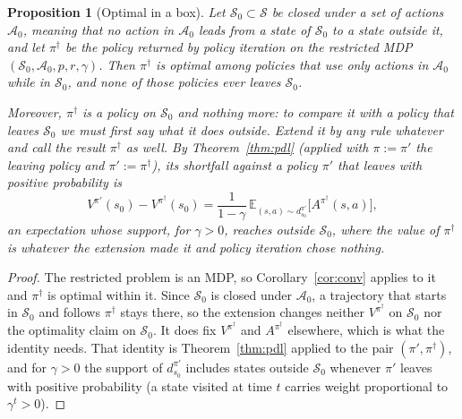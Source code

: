 \documentclass[11pt,a4paper]{article}
\newcommand{\E}{\mathbb{E}}
\newcommand{\Sset}{\mathcal{S}}
\newcommand{\Aset}{\mathcal{A}}
\newcommand{\occ}[2]{d^{#1}_{#2}}
\theoremstyle{plain}
\newtheorem{proposition}[theorem]{Proposition}
\theoremstyle{definition}
\theoremstyle{remark}
\begin{document}
\begin{proposition}[Optimal in a box]\label{prop:box}
Let $\Sset_0\subset\Sset$ be closed under a set of actions $\Aset_0$, meaning that no action in $\Aset_0$ leads from a state of $\Sset_0$ to a state outside it, and let $\pi^\dagger$ be the policy returned by policy iteration on the restricted MDP $(\Sset_0,\Aset_0,p,r,\gamma)$. Then $\pi^\dagger$ is optimal among policies that use only actions in $\Aset_0$ while in $\Sset_0$, and none of those policies ever leaves $\Sset_0$.

Moreover, $\pi^\dagger$ is a policy on $\Sset_0$ and nothing more: to compare it with a policy that leaves $\Sset_0$ we must first say what it does outside. Extend it by any rule whatever and call the result $\pi^\dagger$ as well. By Theorem~\ref{thm:pdl} (applied with $\pi:=\pi'$ the leaving policy and $\pi':=\pi^\dagger$), its shortfall against a policy $\pi'$ that leaves with positive probability is
\[
V^{\pi'}(s_0)-V^{\pi^\dagger}(s_0)=\frac1{1-\gamma}\,\E_{(s,a)\sim\occ{\pi'}{s_0}}\big[A^{\pi^\dagger}(s,a)\big],
\]
an expectation whose support, for $\gamma>0$, reaches outside $\Sset_0$, where the value of $\pi^\dagger$ is whatever the extension made it and policy iteration chose nothing.
\end{proposition}
\begin{proof}
The restricted problem is an MDP, so Corollary~\ref{cor:conv} applies to it and $\pi^\dagger$ is optimal within it. Since $\Sset_0$ is closed under $\Aset_0$, a trajectory that starts in $\Sset_0$ and follows $\pi^\dagger$ stays there, so the extension changes neither $V^{\pi^\dagger}$ on $\Sset_0$ nor the optimality claim on $\Sset_0$. It does fix $V^{\pi^\dagger}$ and $A^{\pi^\dagger}$ elsewhere, which is what the identity needs. That identity is Theorem~\ref{thm:pdl} applied to the pair $(\pi',\pi^\dagger)$, and for $\gamma>0$ the support of $\occ{\pi'}{s_0}$ includes states outside $\Sset_0$ whenever $\pi'$ leaves with positive probability (a state visited at time $t$ carries weight proportional to $\gamma^t>0$).
\end{proof}
\end{document}
